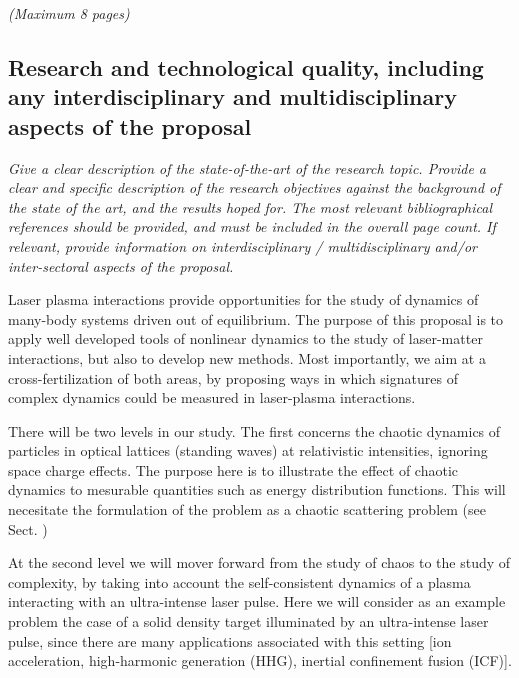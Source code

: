 \documentclass[a4paper,11pt]{article}
\newenvironment{xcomment}{\em}{}
\begin{document}
\begin{bibunit}

\begin{xcomment}  
(Maximum 8 pages)  
\end{xcomment}

\subsection{Research and technological quality, including any interdisciplinary and multidisciplinary aspects of the proposal}

\begin{xcomment}
Give a clear description of the state-of-the-art of the research topic. Provide a clear and specific
description of the research objectives against the background of the state of the art, and the
results hoped for. The most relevant bibliographical references should be provided, and must be
included in the overall page count. If relevant, provide information on interdisciplinary /
multidisciplinary and/or inter-sectoral aspects of the proposal.
\end{xcomment}

Laser plasma interactions provide opportunities for the study of dynamics of many-body systems
driven out of equilibrium. The purpose of this proposal is to apply well developed tools of
nonlinear dynamics to the study of laser-matter interactions, but also to develop new methods.
Most importantly, we aim at a cross-fertilization of both areas, by proposing ways in which
signatures of complex dynamics could be measured in laser-plasma interactions.

There will be two levels in our study. The first concerns the chaotic dynamics of particles in optical
lattices (standing waves) at relativistic intensities, ignoring space charge effects. The
purpose here is to illustrate the effect of chaotic dynamics to mesurable quantities such as 
energy distribution functions. This will necesitate the formulation of the problem as a
chaotic scattering problem (see Sect. )

At the second level we will mover forward from the study of chaos to the study of complexity,
by taking into account the self-consistent dynamics of a plasma interacting with an ultra-intense
laser pulse. Here we will consider as an example problem the case of a solid density target
illuminated by an ultra-intense laser pulse, since there are many applications associated with
this setting [ion acceleration, high-harmonic generation (HHG), inertial confinement fusion (ICF)].


\end{bibunit}
\end{document}
